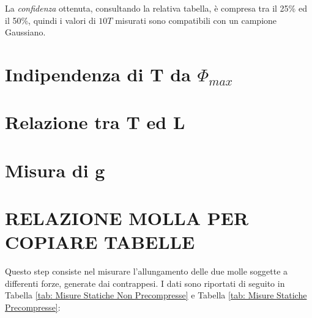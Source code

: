 \documentclass[12pt, a4paper]{article}
\begin{document}
La \textit{confidenza} ottenuta, consultando la relativa tabella, è compresa tra il 25\% ed il 50\%, quindi i valori di $10T$ misurati sono compatibili con un campione Gaussiano.







\section{Indipendenza di T da $\Phi_{max}$}

\section{Relazione tra T ed L}

\section{Misura di g}














\newpage
\section{RELAZIONE MOLLA PER COPIARE TABELLE}
Questo step consiste nel misurare l'allungamento delle due molle soggette a differenti forze, generate dai contrappesi. I dati sono riportati di seguito in Tabella \ref{tab: Misure Statiche Non Precompresse} e Tabella \ref{tab: Misure Statiche Precompresse}:
\\
\end{document}
